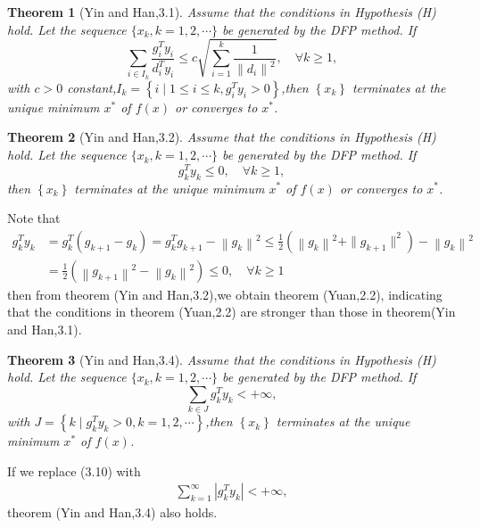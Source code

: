 \documentclass[12pt,a4paper,draft]{article}  %
\newtheorem{theorem}{Theorem}[section]
\theoremstyle{definition}
\numberwithin{equation}{section}
\begin{document}
\begin{theorem}[Yin and Han,3.1]
Assume that the conditions in Hypothesis (H) hold. Let the sequence $\{x_{k}, k=1,2, \cdots\}$ be generated by the DFP method. If\begin{equation*}
    \sum_{i \in I_k} \frac{g_i^T y_i}{d_i^T y_i} \leq c \sqrt{\sum_{i=1}^k \frac{1}{\left\|d_i\right\|^2}}, \quad \forall k \geq 1,
\end{equation*}
with $c>0$ constant,$I_k=\left\{i \mid 1 \leq i \leq k, g_i^T y_i>0\right\}$,then $\left\{x_k\right\}$ terminates at the unique minimum $x^{*}$ of $f(x)$ or converges to $x^{*}$.
    
\end{theorem}

\begin{theorem}[Yin and Han,3.2]
Assume that the conditions in Hypothesis (H) hold. Let the sequence $\{x_{k}, k=1,2, \cdots\}$ be generated by the DFP method. If \begin{equation*}
    g_k^T y_k \leq 0, \quad \forall k \geq 1,
\end{equation*}
then $\left\{x_k\right\}$ terminates at the unique minimum $x^{*}$ of $f(x)$ or converges to $x^{*}$.
\end{theorem}

Note that 
\begin{align*}
g_k^T y_k & =g_k^T\left(g_{k+1}-g_k\right)=g_k^T g_{k+1}-\left\|g_k\right\|^2 \leq \frac{1}{2}\left(\left\|g_k\right\|^2+\|g_{k+1} \|^2\right)-\left\|g_k\right\|^2 \\
& =\frac{1}{2}\left(\left\|g_{k+1}\right\|^2-\left\|g_k\right\|^2\right) \leq 0, \quad \forall k \geq 1
\end{align*}
then from theorem (Yin and Han,3.2),we obtain theorem (Yuan,2.2), indicating that the conditions in theorem (Yuan,2.2) are stronger than those in theorem(Yin and Han,3.1).

\begin{theorem}[Yin and Han,3.4]
Assume that the conditions in Hypothesis (H) hold. Let the sequence $\{x_{k}, k=1,2, \cdots\}$ be generated by the DFP method. If \begin{equation*}
    \sum_{k \in J} g_k^T y_k<+\infty, \tag{3.10}
\end{equation*}
with $J=\left\{k \mid g_k^T y_k>0, k=1,2, \cdots\right\}$,then $\left\{x_k\right\}$ terminates at the unique minimum $x^{*}$ of $f(x)$.
\end{theorem}
If we replace (3.10) with
\begin{align*}
    \sum_{k=1}^{\infty}\left|g_k^T y_k\right|<+\infty, \tag{3.12}
\end{align*}
theorem (Yin and Han,3.4) also holds.
\end{document}
